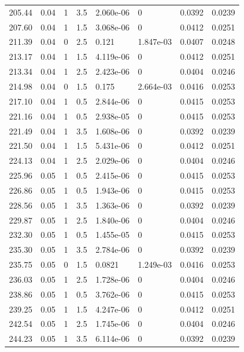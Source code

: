 \documentclass[preview]{standalone}
\begin{document}
{{{\begin{tabular}{L{1.2cm}C{1.2cm} C{0.3cm}C{0.5cm} C{1.4cm}C{1.4cm} C{1.4cm}C{1.4cm}}
  205.44  &  0.04  & 1     & 3.5 &  2.060e-06  & 0  & 0.0392 &  0.0239   \\ 
  207.60  &  0.04  & 1     & 1.5 &  3.068e-06  & 0  & 0.0412 &  0.0251   \\ 
  211.39  &  0.04  & 0     & 2.5 &  0.121  & 1.847e-03  & 0.0407 &  0.0248   \\ 
  213.17  &  0.04  & 1     & 1.5 &  4.119e-06  & 0  & 0.0412 &  0.0251   \\ 
  213.34  &  0.04  & 1     & 2.5 &  2.423e-06  & 0  & 0.0404 &  0.0246   \\ 
  214.98  &  0.04  & 0     & 1.5 &  0.175  & 2.664e-03  & 0.0416 &  0.0253   \\ 
  217.10  &  0.04  & 1     & 0.5 &  2.844e-06  & 0  & 0.0415 &  0.0253   \\ 
  221.16  &  0.04  & 1     & 0.5 &  2.938e-05  & 0  & 0.0415 &  0.0253   \\ 
  221.49  &  0.04  & 1     & 3.5 &  1.608e-06  & 0  & 0.0392 &  0.0239   \\ 
  221.50  &  0.04  & 1     & 1.5 &  5.431e-06  & 0  & 0.0412 &  0.0251   \\ 
  224.13  &  0.04  & 1     & 2.5 &  2.029e-06  & 0  & 0.0404 &  0.0246   \\ 
  225.96  &  0.05  & 1     & 0.5 &  2.415e-06  & 0  & 0.0415 &  0.0253   \\ 
  226.86  &  0.05  & 1     & 0.5 &  1.943e-06  & 0  & 0.0415 &  0.0253   \\ 
  228.56  &  0.05  & 1     & 3.5 &  1.363e-06  & 0  & 0.0392 &  0.0239   \\ 
  229.87  &  0.05  & 1     & 2.5 &  1.840e-06  & 0  & 0.0404 &  0.0246   \\ 
  232.30  &  0.05  & 1     & 0.5 &  1.455e-05  & 0  & 0.0415 &  0.0253   \\ 
  235.30  &  0.05  & 1     & 3.5 &  2.784e-06  & 0  & 0.0392 &  0.0239   \\ 
  235.75  &  0.05  & 0     & 1.5 &  0.0821  & 1.249e-03  & 0.0416 &  0.0253   \\ 
  236.03  &  0.05  & 1     & 2.5 &  1.728e-06  & 0  & 0.0404 &  0.0246   \\ 
  238.86  &  0.05  & 1     & 0.5 &  3.762e-06  & 0  & 0.0415 &  0.0253   \\ 
  239.25  &  0.05  & 1     & 1.5 &  4.247e-06  & 0  & 0.0412 &  0.0251   \\ 
  242.54  &  0.05  & 1     & 2.5 &  1.745e-06  & 0  & 0.0404 &  0.0246   \\ 
  244.23  &  0.05  & 1     & 3.5 &  6.114e-06  & 0  & 0.0392 &  0.0239   \\ 

\end{tabular}}}}
\end{document}
